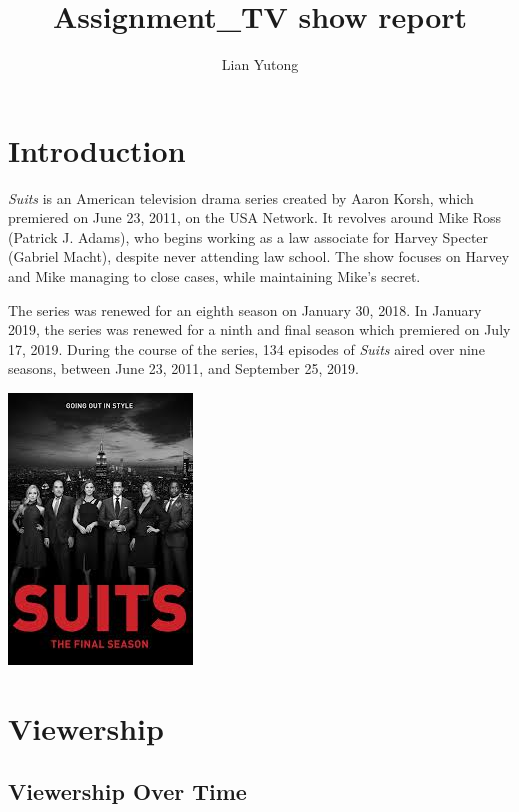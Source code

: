 \documentclass[
  letterpaper,
  DIV=11,
  numbers=noendperiod,
  oneside]{scrartcl}
\title{Assignment\_TV show report}
\author{Lian Yutong}
\date{}
\renewcommand*\contentsname{Table of contents}
\newcommand\contentsname{Table of contents}
\begin{document}
\maketitle

\renewcommand*\contentsname{Table of contents}
{
\hypersetup{linkcolor=}
\setcounter{tocdepth}{2}
\tableofcontents
}
\listoffigures

\section{Introduction}\label{introduction}

\emph{Suits} is an American television drama series created by Aaron
Korsh, which premiered on June 23, 2011, on the USA Network. It revolves
around Mike Ross (Patrick J. Adams), who begins working as a law
associate for Harvey Specter (Gabriel Macht), despite never attending
law school. The show focuses on Harvey and Mike managing to close cases,
while maintaining Mike's secret.

The series was renewed for an eighth season on January 30, 2018. In
January 2019, the series was renewed for a ninth and final season which
premiered on July 17, 2019. During the course of the series, 134
episodes of \emph{Suits} aired over nine seasons, between June 23, 2011,
and September 25, 2019.

\begin{center}
\includegraphics{images/suits-01.jpg}
\end{center}

\section{Viewership}\label{viewership}

\subsection{Viewership Over Time}\label{viewership-over-time}
\end{document}
